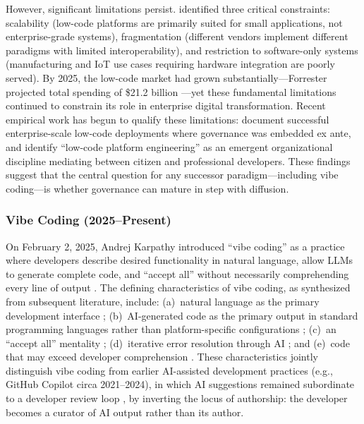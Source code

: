 \documentclass[preprint,12pt,authoryear]{elsarticle}
\begin{document}
However, significant limitations persist. \citet{Tisi2019} identified three critical constraints: scalability (low-code platforms are primarily suited for small applications, not enterprise-grade systems), fragmentation (different vendors implement different paradigms with limited interoperability), and restriction to software-only systems (manufacturing and IoT use cases requiring hardware integration are poorly served). By 2025, the low-code market had grown substantially---Forrester projected total spending of \$21.2 billion \citep{Rymer2019}---yet these fundamental limitations continued to constrain its role in enterprise digital transformation. Recent empirical work has begun to qualify these limitations: \citet{Bock2021} document successful enterprise-scale low-code deployments where governance was embedded ex ante, and \citet{Prinz2021} identify ``low-code platform engineering'' as an emergent organizational discipline mediating between citizen and professional developers. These findings suggest that the central question for any successor paradigm---including vibe coding---is whether governance can mature in step with diffusion.

\subsubsection{Vibe Coding (2025--Present)}

On February 2, 2025, Andrej Karpathy introduced ``vibe coding'' as a practice where developers describe desired functionality in natural language, allow LLMs to generate complete code, and ``accept all'' without necessarily comprehending every line of output \citep{Karpathy2025}. The defining characteristics of vibe coding, as synthesized from subsequent literature, include: (a)~natural language as the primary development interface \citep{Fawzy2025, SurveyVibeCoding2025}; (b)~AI-generated code as the primary output in standard programming languages rather than platform-specific configurations \citep{VibeCodingAINative2025}; (c)~an ``accept all'' mentality \citep{Karpathy2025, Fawzy2025}; (d)~iterative error resolution through AI \citep{SurveyVibeCoding2025}; and (e)~code that may exceed developer comprehension \citep{Karpathy2025, VibeCodingFlowDebt2025}. These characteristics jointly distinguish vibe coding from earlier AI-assisted development practices (e.g., GitHub Copilot circa 2021--2024), in which AI suggestions remained subordinate to a developer review loop \citep{Ziegler2022, Bird2023}, by inverting the locus of authorship: the developer becomes a curator of AI output rather than its author.
\end{document}

